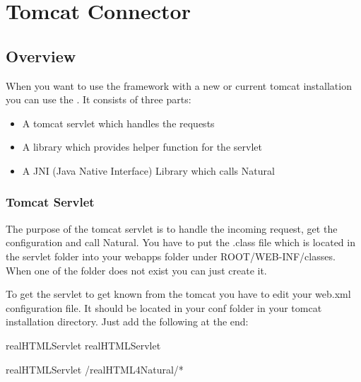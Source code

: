 \documentclass[letterpaper,10pt,english]{sphinxmanual}
\begin{document}
\section{Tomcat Connector}
\label{\detokenize{connector::doc}}\label{\detokenize{connector:tomcat-connector}}

\subsection{Overview}
\label{\detokenize{connector:overview}}
When you want to use the framework with a new or current tomcat installation you can use the . It consists of three parts:
\begin{itemize}
\item {} 
A tomcat servlet which handles the requests

\item {} 
A library which provides helper function for the servlet

\item {} 
A JNI (Java Native Interface) Library which calls Natural

\end{itemize}


\subsubsection{Tomcat Servlet}
\label{\detokenize{connector:tomcat-servlet}}
The purpose of the tomcat servlet is to handle the incoming request, get the configuration and call Natural.
You have to put the .class file which is located in the servlet folder into your webapps folder under \sphinxquotedblleft{}ROOT/WEB-INF/classes\sphinxquotedblright{}. When one of the folder does not exist you can just create it.

To get the servlet to get known from the tomcat you have to edit your web.xml configuration file. It should be located in your \sphinxquotedblleft{}conf\sphinxquotedblright{} folder in your tomcat installation directory. Just add the following at the end:

\begin{sphinxVerbatim}[commandchars=\\\{\}]
    realHTMLServlet
    realHTMLServlet

    realHTMLServlet
    /realHTML4Natural/*
\end{sphinxVerbatim}
\end{document}
